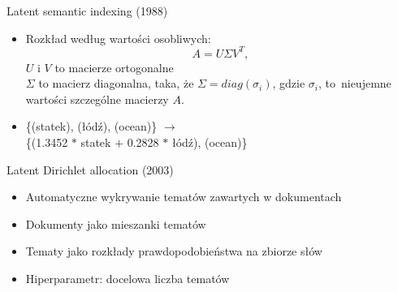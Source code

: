 \documentclass{beamer}
\begin{document}
	\begin{frame}{Latent semantic indexing (1988)}
		\begin{itemize}
			\setlength\itemsep{3em}
			\item Rozkład według wartości osobliwych:
				\begin{equation}
				\label{eq:svd}
				A = U \Sigma V^T,\!
				\end{equation}
				$U$ i $V$ to macierze ortogonalne\\
				$\Sigma$ to macierz diagonalna, taka, że $\Sigma = diag(\sigma_i)$, gdzie $\sigma_{i}$, to~nieujemne wartości szczególne macierzy $A$.
			\item 
			\{(statek), (łódź), (ocean)\} $\to$ \\\{(1.3452 $*$ statek $+$ 0.2828 $*$ łódź), (ocean)\}
		\end{itemize}
	\end{frame}
	\begin{frame}{Latent Dirichlet allocation (2003)}
		\begin{itemize}
			\item Automatyczne wykrywanie tematów zawartych w dokumentach
			\item Dokumenty jako mieszanki tematów
			\item Tematy jako rozkłady prawdopodobieństwa na zbiorze słów
			\item Hiperparametr: docelowa liczba tematów
		\end{itemize}
	\end{frame}
\end{document}
